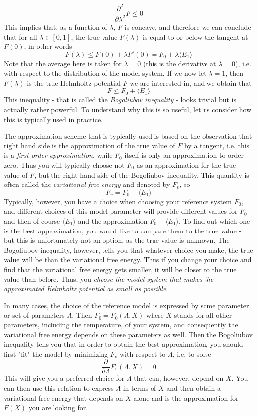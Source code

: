 \documentclass[a4paper, draft]{article}
\theoremstyle{own}
\theoremstyle{remark}
\begin{document}
$$
\frac{\partial^2}{\partial \lambda^2} F \leq 0
$$
This implies that, as a function of $\lambda$, $F$ is concave, and therefore we can conclude that for all $\lambda \in [0,1]$, the true value $F(\lambda)$ is equal to or below the tangent at $F(0)$, in other words
$$
F(\lambda) \leq F(0) + \lambda F'(0) = F_0 + \lambda \langle E_1 \rangle 
$$
Note that the average here is taken for $\lambda = 0$ (this is the derivative at $\lambda = 0$), i.e. with respect to the distribution of the model system. 
If we now let $\lambda = 1$, then $F(\lambda)$ is the true Helmholtz potential $F$ we are interested in, and we obtain that
$$
F \leq F_0 + \langle E_1 \rangle 
$$
This inequality -  that is called the {\em Bogoliubov inequality} - looks trivial but is actually rather powerful. To understand why this is so useful, let us consider how this is typically used in practice. 

The approximation scheme that is typically used is based on the observation that right hand side is the approximation of the true value of $F$ by a tangent, i.e. this is a {\em first order approximation}, while $F_0$ itself is only an approximation to order zero. Thus you will typically choose not $F_0$ as an approximation for the true value of $F$, but the right hand side of the Bogoliubov inequality. This quantity is often called the {\em variational free energy} and denoted by $F_v$, so
$$
F_v = F_0 + \langle E_1 \rangle 
$$
Typically, however, you have a choice when choosing your reference system $F_0$, and different choices of this model parameter will provide different values for $F_0$ and then of course $\langle E_1 \rangle$ and the approximation $F_0 + \langle E_1 \rangle$. To find out which one is the best approximation, you would like to compare them to the true value - but this is unfortunately not an option, as the true value is unknown. The Bogoliubov inequality, however, tells you that whatever choice you make, the true value will be than the variational free energy. Thus if you change your choice and find that the variational free energy gets smaller, it will be closer to the true value than before. Thus, you {\em choose the model system that makes the approximated Helmholtz potential as small as possible}. 

In many cases, the choice of the reference model is expressed by some parameter or set of parameters $\Lambda$. Then $F_0 = F_0(\Lambda, X)$ where $X$ stands for all other parameters, including the temperature, of your system, and consequently the variational free energy depends on these parameters as well. Then the Bogoliubov inequality tells you that in order to obtain the best approximation, you should first "fit" the model by minimizing $F_v$ with respect to $\Lambda$, i.e. to solve
$$
\frac{\partial}{\partial \Lambda} F_v(\Lambda, X) = 0
$$
This will give you a preferred choice for $\Lambda$ that can, however, depend on $X$. You can then use this relation to express $\Lambda$ in terms of $X$ and then obtain a variational free energy that depends on $X$ alone and is the approximation for $F(X)$ you are looking for.
\end{document}
